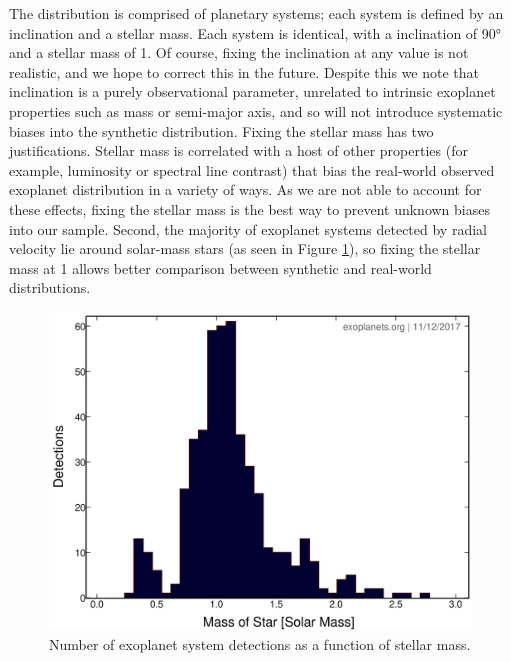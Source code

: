 \documentclass[12pt,manuscript]{aastex}
\begin{document}
The distribution is comprised of planetary systems; each system is defined by an inclination and a stellar mass. 
Each system is identical, with a inclination of \ang{90} and a stellar mass of \SI{1}{\Msun}.
Of course, fixing the inclination at any value is not realistic, and we hope to correct this in the future. 
Despite this we note that inclination is a purely observational parameter, unrelated to intrinsic exoplanet properties such as mass or semi-major axis, and so will not introduce systematic biases into the synthetic distribution.
Fixing the stellar mass has two justifications.
Stellar mass is correlated with a host of other properties (for example, luminosity or spectral line contrast) that bias the real-world observed exoplanet distribution in a variety of ways. 
As we are not able to account for these effects, fixing the stellar mass is the best way to prevent unknown biases into our sample. 
Second, the majority of exoplanet systems detected by radial velocity lie around solar-mass stars (as seen in Figure \ref{fig: solar mass}), so fixing the stellar mass at \SI{1}{\Msun} allows better comparison between synthetic and real-world distributions.

\begin{figure}[h]
  \centering
  \includegraphics[width=0.5\linewidth]{../figures/solar_mass_detections}
  \caption{Number of exoplanet system detections as a function of stellar mass.}
  \label{fig: solar mass}
\end{figure}
\end{document}
